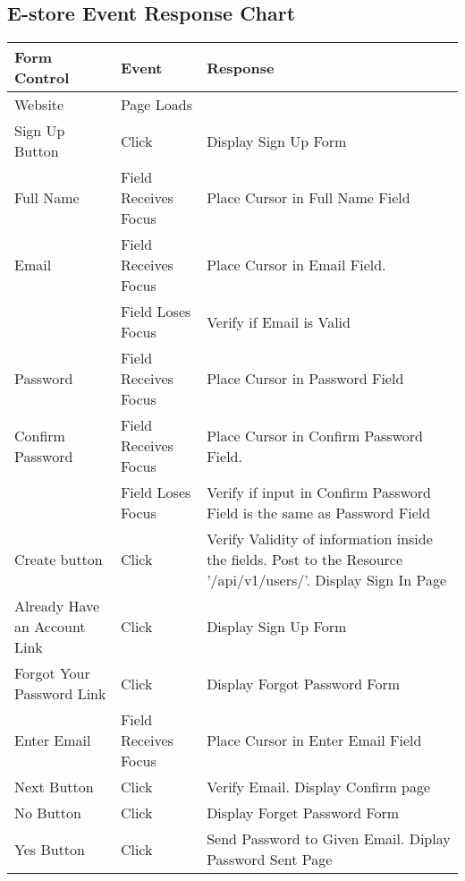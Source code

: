 \documentclass[12pt]{article}
\begin{document}
\begin{center}
	\section*{E-store Event Response Chart}	
	\begin{tabular}{ m{1.5in} | m{1.5in} | m{1.5in} }	
	\textbf{Form Control} & \textbf{Event} & \textbf{Response} \\
	\hline
	Website & Page Loads & \\
	\hline
	Sign Up Button & Click & Display Sign Up Form \\
	\hline
	Full Name & Field Receives Focus & Place Cursor in Full Name Field \\
	\hline
	Email & Field Receives Focus & Place Cursor in Email Field. \\
	      & Field Loses Focus & Verify if Email is Valid \\
	\hline
	Password & Field Receives Focus & Place Cursor in Password Field \\
	\hline
	Confirm Password & Field Receives Focus & Place Cursor in Confirm Password Field. \\
	& Field Loses Focus & Verify if input in Confirm Password Field is the same as Password Field \\
	\hline
	Create button & Click & Verify Validity of information inside the fields. Post to the Resource '/api/v1/users/'. Display Sign In Page  \\
	\hline
	Already Have an Account Link & Click & Display Sign Up Form \\
	\hline
	Forgot Your Password Link & Click & Display Forgot Password Form \\
	\hline 	
	Enter Email & Field Receives Focus & Place Cursor in Enter Email Field \\
	\hline
	Next Button & Click & Verify Email. Display Confirm page \\
	\hline
	No Button & Click & Display Forget Password Form \\
	\hline
	Yes Button & Click & Send Password to Given Email. Diplay Password Sent Page \\
	\end{tabular}
	\newpage
	

\end{center}
\end{document}

